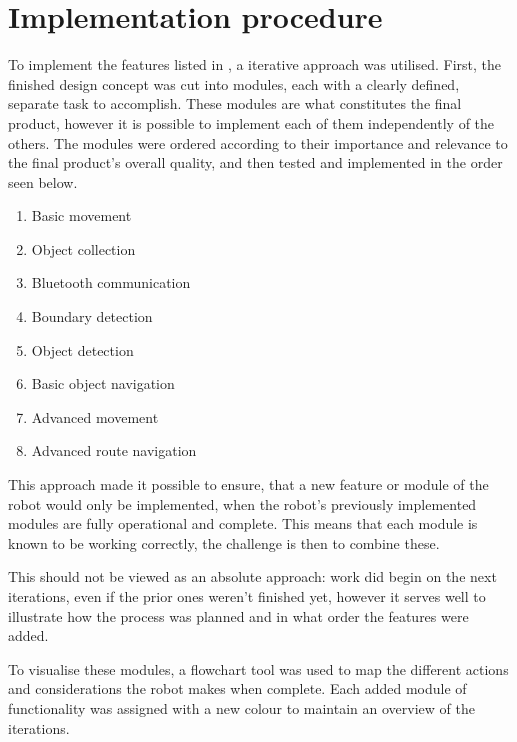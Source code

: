 \section{Implementation procedure} \label{sec:imp-procedure}

To implement the features listed in , a iterative approach was utilised. First, the finished design concept was cut into modules, each with a clearly defined, separate task to accomplish. These modules are what constitutes the final product, however it is possible to implement each of them independently of the others. The modules were ordered according to their importance and relevance to the final product's overall quality, and then tested and implemented in the order seen below.

\begin{enumerate}
\item Basic movement
\item Object collection
\item Bluetooth communication
\item Boundary detection
\item Object detection
\item Basic object navigation
\item Advanced movement
\item Advanced route navigation
\end{enumerate}

This approach made it possible to ensure, that a new feature or module of the robot would only be implemented, when the robot's previously implemented modules are fully operational and complete. This means that each module is known to be working correctly, the challenge is then to combine these. 

This should not be viewed as an absolute approach: work did begin on the next iterations, even if the prior ones weren't finished yet, however it serves well to illustrate how the process was planned and in what order the features were added.

To visualise these modules, a flowchart tool was used to map the different actions and considerations the robot makes when complete. Each added module of functionality was assigned with a new colour to maintain an overview of the iterations. 

